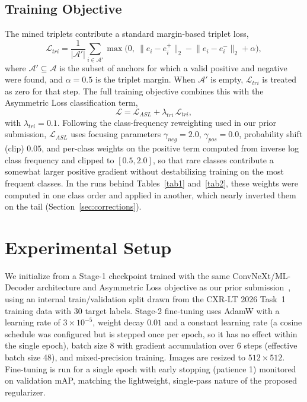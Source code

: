 \documentclass[conference]{IEEEtran}
\begin{document}
\subsection{Training Objective}
The mined triplets contribute a standard margin-based triplet loss,
\begin{equation}
\mathcal{L}_{tri} = \frac{1}{|\mathcal{A}'|}\sum_{i \in \mathcal{A}'} \max\bigl(0,\ \lVert e_i - e_i^{+}\rVert_2 - \lVert e_i - e_i^{-}\rVert_2 + \alpha \bigr),
\label{eq:triplet}
\end{equation}
where $\mathcal{A}'\subseteq\mathcal{A}$ is the subset of anchors for which a valid positive and negative were found, and $\alpha{=}0.5$ is the triplet margin. When $\mathcal{A}'$ is empty, $\mathcal{L}_{tri}$ is treated as zero for that step. The full training objective combines this with the Asymmetric Loss classification term,
\begin{equation}
\mathcal{L} = \mathcal{L}_{ASL} + \lambda_{tri}\,\mathcal{L}_{tri},
\label{eq:total}
\end{equation}
with $\lambda_{tri}{=}0.1$. Following the class-frequency reweighting used in our prior submission, $\mathcal{L}_{ASL}$ uses focusing parameters $\gamma_{neg}{=}2.0$, $\gamma_{pos}{=}0.0$, probability shift (clip) $0.05$, and per-class weights on the positive term computed from inverse log class frequency and clipped to $[0.5, 2.0]$, so that rare classes contribute a somewhat larger positive gradient without destabilizing training on the most frequent classes. In the runs behind Tables~\ref{tab1} and~\ref{tab2}, these weights were computed in one class order and applied in another, which nearly inverted them on the tail (Section~\ref{sec:corrections}).

\section{Experimental Setup}
We initialize from a Stage-1 checkpoint trained with the same ConvNeXt/ML-Decoder architecture and Asymmetric Loss objective as our prior submission~\cite{b12}, using an internal train/validation split drawn from the CXR-LT 2026 Task~1 training data with 30 target labels. Stage-2 fine-tuning uses AdamW with a learning rate of $3\times10^{-5}$, weight decay $0.01$ and a constant learning rate (a cosine schedule was configured but is stepped once per epoch, so it has no effect within the single epoch), batch size 8 with gradient accumulation over 6 steps (effective batch size 48), and mixed-precision training. Images are resized to $512\times512$. Fine-tuning is run for a single epoch with early stopping (patience 1) monitored on validation mAP, matching the lightweight, single-pass nature of the proposed regularizer.
\end{document}

